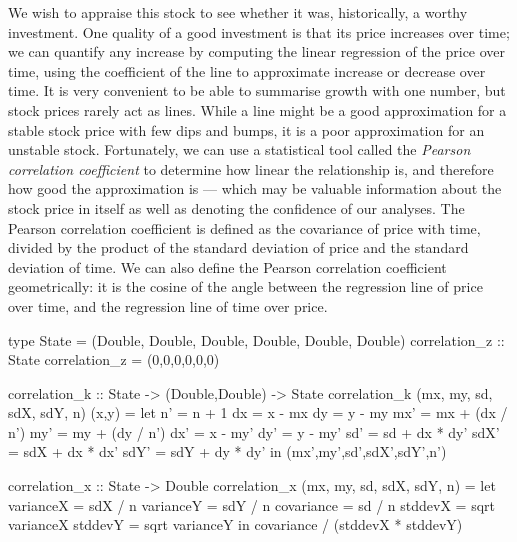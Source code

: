 We wish to appraise this stock to see whether it was, historically, a worthy investment.
One quality of a good investment is that its price increases over time; we can quantify any increase by computing the linear regression of the price over time, using the coefficient of the line to approximate increase or decrease over time.
It is very convenient to be able to summarise growth with one number, but stock prices rarely act as lines.
While a line might be a good approximation for a stable stock price with few dips and bumps, it is a poor approximation for an unstable stock.
Fortunately, we can use a statistical tool called the \emph{Pearson correlation coefficient} to determine how linear the relationship is, and therefore how good the approximation is --- which may be valuable information about the stock price in itself as well as denoting the confidence of our analyses.
The Pearson correlation coefficient is defined as the covariance of price with time, divided by the product of the standard deviation of price and the standard deviation of time.
We can also define the Pearson correlation coefficient geometrically: it is the cosine of the angle between the regression line of price over time, and the regression line of time over price.




\begin{haskell}[float,label=figs/impl/correlation,caption=One-pass correlation implementation]
type State = (Double, Double, Double, Double, Double, Double)
correlation_z :: State
correlation_z = (0,0,0,0,0,0)

correlation_k :: State -> (Double,Double) -> State
correlation_k (mx, my, sd, sdX, sdY, n) (x,y) =
 let n'   = n   + 1
     dx   = x   - mx
     dy   = y   - my
     mx'  = mx  + (dx / n')
     my'  = my  + (dy / n')
     dx'  = x   - my'
     dy'  = y   - my'
     sd'  = sd  + dx * dy'
     sdX' = sdX + dx * dx'
     sdY' = sdY + dy * dy'
 in (mx',my',sd',sdX',sdY',n')

correlation_x :: State -> Double
correlation_x (mx, my, sd, sdX, sdY, n) =
  let varianceX  = sdX / n
      varianceY  = sdY / n
      covariance = sd  / n
      stddevX = sqrt varianceX
      stddevY = sqrt varianceY
  in covariance / (stddevX * stddevY)
\end{haskell}


